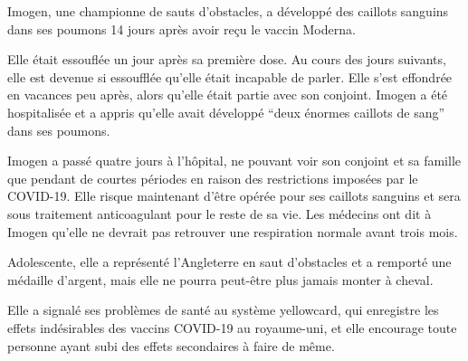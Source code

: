Imogen, une championne de sauts d'obstacles, a développé des caillots sanguins
dans ses poumons 14 jours après avoir reçu le vaccin Moderna.

Elle était essouflée un jour après sa première dose. Au cours des jours
suivants, elle est devenue si essoufflée qu'elle était incapable de parler. Elle
s'est effondrée en vacances peu après, alors qu'elle était partie avec son
conjoint. Imogen a été hospitalisée et a appris qu'elle avait développé “deux
énormes caillots de sang” dans ses poumons.

Imogen a passé quatre jours à l'hôpital, ne pouvant voir son conjoint et sa
famille que pendant de courtes périodes en raison des restrictions imposées par
le COVID-19. Elle risque maintenant d'être opérée pour ses caillots sanguins et
sera sous traitement anticoagulant pour le reste de sa vie. Les médecins ont dit
à Imogen qu'elle ne devrait pas retrouver une respiration normale avant trois
mois.

Adolescente, elle a représenté l'Angleterre en saut d'obstacles et a remporté
une médaille d'argent, mais elle ne pourra peut-être plus jamais monter à
cheval.

Elle a signalé ses problèmes de santé au système yellowcard, qui enregistre les
effets indésirables des vaccins COVID-19 au royaume-uni, et elle encourage toute
personne ayant subi des effets secondaires à faire de même.

